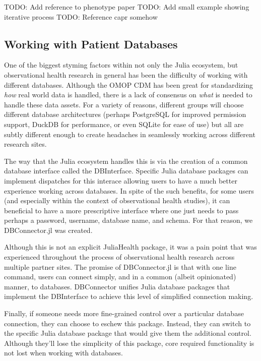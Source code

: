\documentclass{juliacon}
\begin{document}
TODO: Add reference to phenotype paper
TODO: Add small example showing iterative process 
TODO: Reference capr somehow

\subsection{Working with Patient Databases}

One of the biggest styming factors within not only the Julia ecosystem, but observational health research in general has been the difficulty of working with different databases.
Although the OMOP CDM has been great for standardizing \textit{how} real world data is handled, there is a lack of consensus on \textit{what} is needed to handle these data assets.
For a variety of reasons, different groups will choose different database architectures (perhaps PostgreSQL for improved permission support, DuckDB for performance, or even SQLite for ease of use) but all are subtly different enough to create headaches in seamlessly working across different research sites.

The way that the Julia ecosystem handles this is via the creation of a common database interface called the DBInterface.
Specific Julia database packages can implement dispatches for this interace allowing users to have a much better experience working across databases.
In spite of the such benefits, for some users (and especially within the context of observational health studies), it can beneficial to have a more prescriptive interface where one just needs to pass perhaps a password, username, database name, and schema.
For that reason, we DBConnector.jl was created.

Although this is not an explicit JuliaHealth package, it was a pain point that was experienced throughout the process of observational health research across multiple partner sites.
The promise of DBConnector.jl is that with one line command, users can connect simply, and in a common (albeit opinionated) manner, to databases.
DBConnector unifies Julia database packages that implement the DBInterface to achieve this level of simplified connection making.

Finally, if someone needs more fine-grained control over a particular database connection, they can choose to eschew this package.
Instead, they can switch to the specific Julia database package that would give them the additional control.
Although they'll lose the simplicity of this package, core required functionality is not lost when working with databases.
\end{document}
